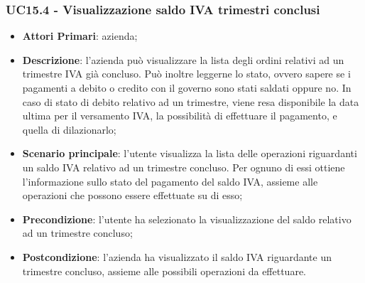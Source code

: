 \subsubsection{UC15.4 - Visualizzazione saldo IVA trimestri conclusi}
\begin{itemize}
	\item \textbf{Attori Primari}: azienda;
	\item \textbf{Descrizione}: l'azienda può visualizzare la lista degli ordini relativi ad un trimestre IVA già concluso. Può inoltre leggerne lo stato, ovvero sapere se i pagamenti a debito o credito con il governo sono stati saldati oppure no. In caso di stato di debito relativo ad un trimestre, viene resa disponibile la data ultima per il versamento IVA, la possibilità di effettuare il pagamento, e quella di dilazionarlo;
	\item \textbf{Scenario principale}: l'utente visualizza la lista delle operazioni riguardanti  un saldo IVA relativo ad un trimestre concluso. Per ognuno di essi ottiene l'informazione sullo stato del pagamento del saldo IVA, assieme alle operazioni che possono essere effettuate su di esso;
	\item \textbf{Precondizione}: l'utente ha selezionato la visualizzazione del saldo relativo ad un trimestre concluso;
	\item \textbf{Postcondizione}: l'azienda ha visualizzato il saldo IVA riguardante un trimestre concluso, assieme alle possibili operazioni da effettuare.
\end{itemize} 


